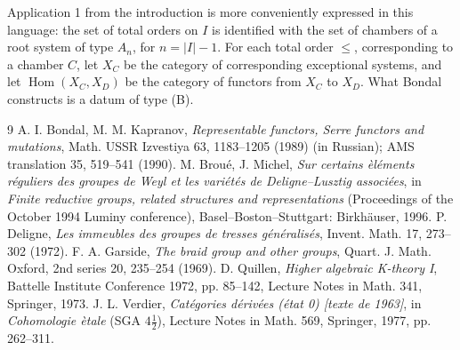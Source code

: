 \documentclass[11pt]{article}
\newcommand{\Hom}{\operatorname{Hom}}
\begin{document}
Application 1 from the introduction is more conveniently expressed in this language: the set of total orders on $I$ is identified with the set of chambers of a root system of type $A_n$, for $n=|I|-1$. For each total order $\leq$, corresponding to a chamber $C$, let $X_C$ be the category of corresponding exceptional systems, and let $\Hom(X_C,X_D)$ be the category of functors from $X_C$ to $X_D$. What Bondal constructs is a datum of type (B).

\begin{thebibliography}{9}
 A. I. Bondal, M. M. Kapranov, \emph{Representable functors, Serre functors and mutations}, Math. USSR Izvestiya 63, 1183--1205 (1989) (in Russian); AMS translation 35, 519--541 (1990).
 M. Brou\'e, J. Michel, \emph{Sur certains \`el\'ements r\'eguliers des groupes de Weyl et les vari\'et\'es de Deligne--Lusztig associ\'ees}, in \emph{Finite reductive groups, related structures and representations} (Proceedings of the October 1994 Luminy conference), Basel--Boston--Stuttgart: Birkh\"auser, 1996.
 P. Deligne, \emph{Les immeubles des groupes de tresses g\'en\'eralis\'es}, Invent. Math. 17, 273--302 (1972).
 F. A. Garside, \emph{The braid group and other groups}, Quart. J. Math. Oxford, 2nd series 20, 235--254 (1969).
 D. Quillen, \emph{Higher algebraic K-theory I}, Battelle Institute Conference 1972, pp. 85--142, Lecture Notes in Math. 341, Springer, 1973.
 J. L. Verdier, \emph{Cat\'egories d\'eriv\'ees (\'etat 0) [texte de 1963]}, in \emph{Cohomologie \`etale} (SGA $4\frac12$), Lecture Notes in Math. 569, Springer, 1977, pp. 262--311.
\end{thebibliography}
\end{document}
